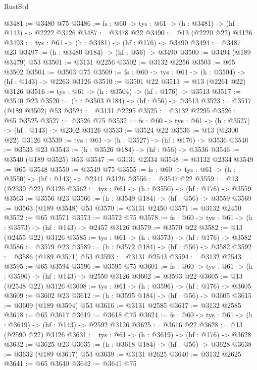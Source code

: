 \begin{lexlean}{RustStd}
\begin{coremodule}
{\begin{coremodule}
{{{{{{{{{{{{@3481 := @3480 @75
@3486 := {fs : @60} -> {tys : @61} -> (h : @3481) -> (hf : @143) -> @2222 @3126
@3487 := @3478 @22
@3490 := @13 (@2220 @22) @3126
@3493 := {tys : @61} -> (h : @3481) -> (hf : @176) -> @3490
@3494 := @3487 @23
@3497 := (h : @3480 @184) -> (hf : @56) -> @3490
@3500 := @3494 (@189 @3479) @53
@3501 := @3131 @2256
@3502 := @3132 @2256
@3503 := @65 @3502
@3504 := @3503 @75
@3509 := {fs : @60} -> {tys : @61} -> (h : @3504) -> (hf : @143) -> @2263 @3126
@3510 := @3501 @22
@3513 := @13 (@2261 @22) @3126
@3516 := {tys : @61} -> (h : @3504) -> (hf : @176) -> @3513
@3517 := @3510 @23
@3520 := (h : @3503 @184) -> (hf : @56) -> @3513
@3523 := @3517 (@189 @3502) @53
@3524 := @3131 @2295
@3525 := @3132 @2295
@3526 := @65 @3525
@3527 := @3526 @75
@3532 := {fs : @60} -> {tys : @61} -> (h : @3527) -> (hf : @143) -> @2302 @3126
@3533 := @3524 @22
@3536 := @13 (@2300 @22) @3126
@3539 := {tys : @61} -> (h : @3527) -> (hf : @176) -> @3536
@3540 := @3533 @23
@3543 := (h : @3526 @184) -> (hf : @56) -> @3536
@3546 := @3540 (@189 @3525) @53
@3547 := @3131 @2334
@3548 := @3132 @2334
@3549 := @65 @3548
@3550 := @3549 @75
@3555 := {fs : @60} -> {tys : @61} -> (h : @3550) -> (hf : @143) -> @2341 @3126
@3556 := @3547 @22
@3559 := @13 (@2339 @22) @3126
@3562 := {tys : @61} -> (h : @3550) -> (hf : @176) -> @3559
@3563 := @3556 @23
@3566 := (h : @3549 @184) -> (hf : @56) -> @3559
@3569 := @3563 (@189 @3548) @53
@3570 := @3131 @2450
@3571 := @3132 @2450
@3572 := @65 @3571
@3573 := @3572 @75
@3578 := {fs : @60} -> {tys : @61} -> (h : @3573) -> (hf : @143) -> @2457 @3126
@3579 := @3570 @22
@3582 := @13 (@2455 @22) @3126
@3585 := {tys : @61} -> (h : @3573) -> (hf : @176) -> @3582
@3586 := @3579 @23
@3589 := (h : @3572 @184) -> (hf : @56) -> @3582
@3592 := @3586 (@189 @3571) @53
@3593 := @3131 @2543
@3594 := @3132 @2543
@3595 := @65 @3594
@3596 := @3595 @75
@3601 := {fs : @60} -> {tys : @61} -> (h : @3596) -> (hf : @143) -> @2550 @3126
@3602 := @3593 @22
@3605 := @13 (@2548 @22) @3126
@3608 := {tys : @61} -> (h : @3596) -> (hf : @176) -> @3605
@3609 := @3602 @23
@3612 := (h : @3595 @184) -> (hf : @56) -> @3605
@3615 := @3609 (@189 @3594) @53
@3616 := @3131 @2585
@3617 := @3132 @2585
@3618 := @65 @3617
@3619 := @3618 @75
@3624 := {fs : @60} -> {tys : @61} -> (h : @3619) -> (hf : @143) -> @2592 @3126
@3625 := @3616 @22
@3628 := @13 (@2590 @22) @3126
@3631 := {tys : @61} -> (h : @3619) -> (hf : @176) -> @3628
@3632 := @3625 @23
@3635 := (h : @3618 @184) -> (hf : @56) -> @3628
@3638 := @3632 (@189 @3617) @53
@3639 := @3131 @2625
@3640 := @3132 @2625
@3641 := @65 @3640
@3642 := @3641 @75
}}}}}}}}}}}}
\end{coremodule}}
\end{coremodule}
\end{lexlean}
